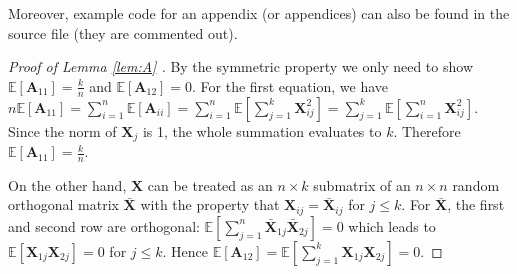 \documentclass[conference,letterpaper]{IEEEtran}
\def\E{\mathbb{E}}
\begin{document}
Moreover, example code for an appendix (or appendices) can also be
found in the source file (they are commented out).

\appendix
\begin{proof}[Proof of Lemma \ref{lem:A} ]
By the symmetric property we only need to show $\E[\bm{A}_{11}] = \frac{k}{n}$ and
$\E[\bm{A}_{12}] = 0$. For the first equation, we have $n\E[\bm{A}_{11}]
= \sum_{i=1}^n \E[\bm{A}_{ii}] = \sum_{i=1}^n \E[ \sum_{j=1}^k \bm{X}^2_{ij}] =
\sum_{j=1}^k \E[\sum_{i=1}^n \bm{X}^2_{ij}]$. Since the norm of $\bm{X}_j$ is 1,
the whole summation evaluates to $k$. Therefore $\E[\bm{A}_{11}] = \frac{k}{n}$.

On the other hand, $\bm{X}$ can be treated as an $n\times k$ submatrix of an $n\times n$
random orthogonal matrix $\bm{\bar{X}}$ with the property that $\bm{X}_{ij} = \bm{\bar{X}}_{ij}$
for $j\leq k$. For $\bm{\bar{X}}$, the first and second row are orthogonal:
 $\E[\sum_{j=1}^n \bm{\bar{X}}_{1j}\bm{\bar{X}}_{2j}] = 0 $ which leads to
 $\E[\bm{X}_{1j}\bm{X}_{2j}] = 0$ for $j \leq k$. Hence $\E[\bm{A}_{12}]=
 \E[\sum_{j=1}^k \bm{X}_{1j}\bm{X}_{2j}]=0$.
\end{proof}
\end{document}
